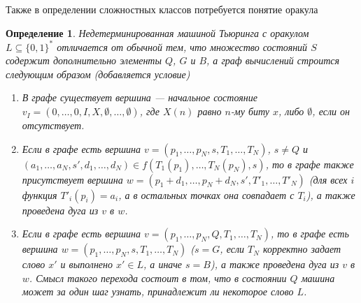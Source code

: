 \documentclass[14pt, a4paper]{extreport}
\newtheorem{definition}{\indent Определение}
\newcommand{\word}{\{0, 1\}^*}
\begin{document}
Также в определении сложностных классов потребуется понятие оракула
\begin{definition}
    Недетерминированная машиной Тьюринга с оракулом $L \subseteq \word$ отличается от обычной тем, что множество состояний $S$ содержит дополнительно элементы $Q$, $G$ и $B$, а граф вычислений строится следующим образом (добавляется условие)
    \begin{enumerate}
        \item В графе существует вершина --- начальное состояние $v_I = \left(0, \ldots, 0, I, X, \emptyset, \ldots, \emptyset\right)$, где $X(n)$ равно $n$-му биту $x$, либо $\emptyset$, если он отсутствует.
        \item Если в графе есть вершина $v = \left(p_1, \ldots, p_N, s, T_1, \ldots, T_N\right)$, $s \neq Q$ и $(a_1, \ldots, a_N,  s', d_1, \ldots, d_N) \in f(T_1(p_1), \ldots, T_N(p_N), s)$, то в графе также присутствует вершина $w = \left(p_1 + d_1, \ldots, p_N + d_N, s', T'_1, \ldots, T'_N\right)$ (для всех $i$ функция $T'_i(p_i) = a_i$, а в остальных точках она совпадает с $T_i$), а также проведена дуга из $v$ в $w$.
        \item Если в графе есть вершина $v = \left(p_1, \ldots, p_N, Q, T_1, \ldots, T_N\right)$, то в графе есть вершина $w = \left(p_1, \ldots, p_N, s, T_1, \ldots, T_N\right)$ ($s = G$, если $T_N$ корректно задает слово $x'$ и выполнено $x' \in L$, а иначе $s = B$), а также проведена дуга из $v$ в $w$. Смысл такого перехода состоит в том, что в состоянии $Q$ машина может за один шаг узнать, принадлежит ли некоторое слово $L$.

    \end{enumerate}

\end{definition}
\end{document}
